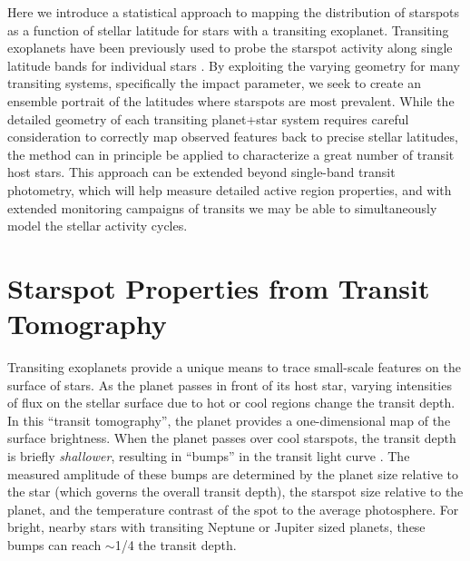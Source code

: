 \documentclass[preprint2]{aastex62}
\begin{document}
Here we introduce a statistical approach to mapping the distribution of starspots as a function of stellar latitude for stars with a transiting exoplanet. Transiting exoplanets have been previously used to probe the starspot activity along single latitude bands for individual stars \citep[e.g.][]{morris2017}. By exploiting the varying geometry for many transiting systems, specifically the impact parameter, we seek to create an ensemble portrait of the latitudes where starspots are most prevalent. While the detailed geometry of each transiting planet+star system requires careful consideration to correctly map observed features back to precise stellar latitudes, the method can in principle be applied to characterize a great number of transit host stars. This approach can be extended beyond single-band transit photometry, which will help measure detailed active region properties, and with extended monitoring campaigns of transits we may be able to simultaneously model the stellar activity cycles.



\section{Starspot Properties from Transit Tomography}
\label{sec:transit}

Transiting exoplanets provide a unique means to trace small-scale features on the surface of stars. As the planet passes in front of its host star, varying intensities of flux on the stellar surface due to hot or cool regions change the transit depth. In this ``transit tomography'', the planet provides a one-dimensional map of the surface brightness. When the planet passes over cool starspots, the transit depth is briefly {\it shallower}, resulting in ``bumps'' in the transit light curve \citep{silva2003}. The measured amplitude of these bumps are determined by the planet size relative to the star (which governs the overall transit depth), the starspot size relative to the planet, and the temperature contrast of the spot to the average photosphere. For bright, nearby stars with transiting Neptune or Jupiter sized planets, these bumps can reach $\sim$1/4 the transit depth.
\end{document}
